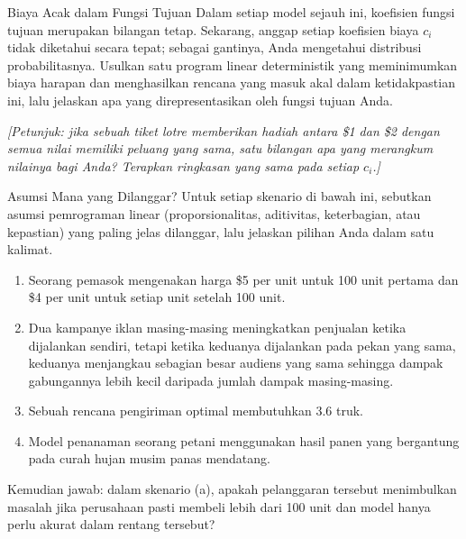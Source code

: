 \begin{ex}{Biaya Acak dalam Fungsi Tujuan}{}
 Dalam setiap model sejauh ini, koefisien fungsi tujuan merupakan bilangan tetap. Sekarang, anggap setiap koefisien biaya $c_i$ tidak diketahui secara tepat; sebagai gantinya, Anda mengetahui distribusi probabilitasnya. Usulkan satu program linear deterministik yang meminimumkan biaya harapan dan menghasilkan rencana yang masuk akal dalam ketidakpastian ini, lalu jelaskan apa yang direpresentasikan oleh fungsi tujuan Anda.

\emph{[Petunjuk: jika sebuah tiket lotre memberikan hadiah antara \$1 dan \$2 dengan semua nilai memiliki peluang yang sama, satu bilangan apa yang merangkum nilainya bagi Anda? Terapkan ringkasan yang sama pada setiap $c_i$.]}
\exrefs{\S\ref{sec:lp-modeling-assumptions}}
\end{ex}

\begin{ex}{Asumsi Mana yang Dilanggar?}{}
\label{ex:assumption-audit}
 Untuk setiap skenario di bawah ini, sebutkan asumsi pemrograman linear (proporsionalitas, aditivitas, keterbagian, atau kepastian) yang paling jelas dilanggar, lalu jelaskan pilihan Anda dalam satu kalimat.
\begin{enumerate}
\item Seorang pemasok mengenakan harga \$5 per unit untuk 100 unit pertama dan \$4 per unit untuk setiap unit setelah 100 unit.
\item Dua kampanye iklan masing-masing meningkatkan penjualan ketika dijalankan sendiri, tetapi ketika keduanya dijalankan pada pekan yang sama, keduanya menjangkau sebagian besar audiens yang sama sehingga dampak gabungannya lebih kecil daripada jumlah dampak masing-masing.
\item Sebuah rencana pengiriman optimal membutuhkan 3.6 truk.
\item Model penanaman seorang petani menggunakan hasil panen yang bergantung pada curah hujan musim panas mendatang.
\end{enumerate}
Kemudian jawab: dalam skenario (a), apakah pelanggaran tersebut menimbulkan masalah jika perusahaan pasti membeli lebih dari 100 unit dan model hanya perlu akurat dalam rentang tersebut?
\end{ex}


